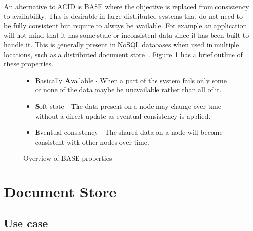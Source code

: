 \documentclass{CRPITStyle}
\renewcommand{\cite}{\citep}
\begin{document}

\paragraph{}
An alternative to ACID is BASE where the objective is replaced from consistency
to availability.
This is desirable in large distributed systems that do not need to be
fully consistent but require to always be available.
For example an application will not mind that it has some stale or
inconsistent data since it has been built to handle it.
This is generally present in NoSQL databases when used in multiple
locations, such as a distributed document store~\cite{base}.
Figure~\ref{l:base} has a brief outline of these properties.

\begin{figure}
\begin{itemize}
    \item \textbf{B}asically \textbf{A}vailable - When a part of the system
        fails only some or none of the data maybe be unavailable rather than
        all of it.
    \item \textbf{S}oft state - The data present on a node may change over time
        without a direct update as eventual consistency is applied.
    \item \textbf{E}ventual consistency - The shared data on a node will become consistent with
        other nodes over time.
\end{itemize}
\caption{Overview of BASE properties~\cite{base}}\label{l:base}
\end{figure}





\section{Document Store}


\subsection{Use case}
\end{document}
